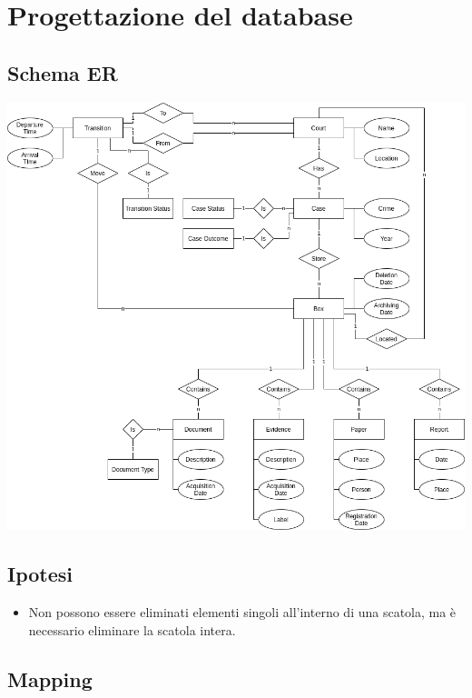 \section{Progettazione del database}
\subsection{Schema ER}

\begin{adjustwidth}{-5cm}{-5cm}
    \vspace{\fill}
    \begin{center}
        \includegraphics[scale=0.50]{./images/er.png}
    \end{center}
    \vspace{\fill}
\end{adjustwidth}

\subsection{Ipotesi}

\begin{itemize}
    \item Non possono essere eliminati elementi singoli all'interno di una scatola, ma è necessario eliminare la scatola intera.
\end{itemize}

\subsection{Mapping}


